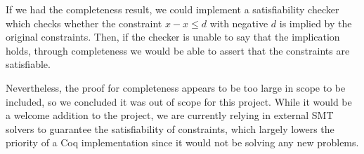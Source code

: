If we had the completeness result, we could implement a satisfiability checker which checks 
whether the constraint $x - x \le d$ with negative $d$ is implied by the original constraints.
Then, if the checker is unable to say that the implication holds, through completeness we would
be able to assert that the constraints are satisfiable.

Nevertheless, the proof for completeness appears to be too large in scope to be included, so we
concluded it was out of scope for this project. While it would be a welcome addition to the project,
we are currently relying in external SMT solvers to guarantee the satisfiability of constraints, 
which largely lowers the priority of a Coq implementation since it would not be solving any new
problems.